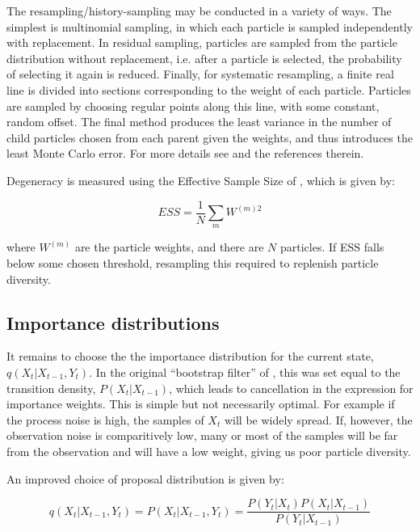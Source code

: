 The resampling/history-sampling may be conducted in a variety of ways. The simplest is multinomial sampling, in which each particle is sampled independently with replacement. In residual sampling, particles are sampled from the particle distribution without replacement, i.e. after a particle is selected, the probability of selecting it again is reduced. Finally, for systematic resampling, a finite real line is divided into sections corresponding to the weight of each particle. Particles are sampled by choosing regular points along this line, with some constant, random offset. The final method produces the least variance in the number of child particles chosen from each parent given the weights, and thus introduces the least Monte Carlo error. For more details see \cite{Doucet2009} and the references therein.

Degeneracy is measured using the Effective Sample Size of \cite{Liu1995}, which is given by:

\begin{equation}
ESS = \frac{1}{N} \sum_m W^{(m)2}
\label{eq:ESS}
\end{equation}

where $W^{(m)}$ are the particle weights, and there are $N$ particles. If ESS falls below some chosen threshold, resampling this required to replenish particle diversity.



\subsection{Importance distributions}

It remains to choose the the importance distribution for the current state, $q(X_{t}|X_{t-1}, Y_{t})$. In the original ``bootstrap filter'' of \cite{Gordon1993}, this was set equal to the transition density, $P(X_t|X_{t-1})$, which leads to cancellation in the expression for importance weights. This is simple but not necessarily optimal. For example if the process noise is high, the samples of $X_t$ will be widely spread. If, however, the observation noise is comparitively low, many or most of the samples will be far from the observation and will have a low weight, giving us poor particle diversity.

An improved choice of proposal distribution is given by:

\begin{equation}
q(X_{t}|X_{t-1}, Y_{t}) = P(X_t|X_{t-1}, Y_t) = \frac{P(Y_t|X_t)P(X_t|X_{t-1})}{P(Y_t|X_{t-1})}
\label{eq:OptimalImportanceDist}
\end{equation}

